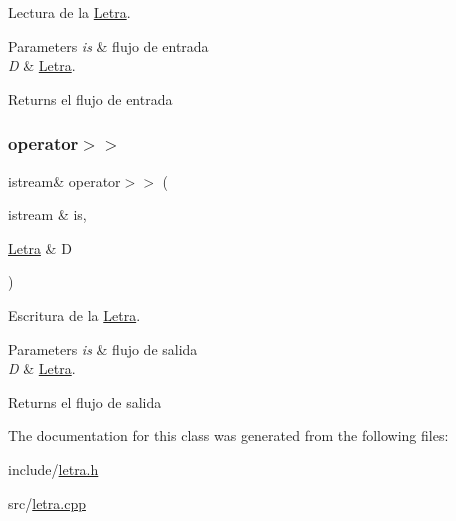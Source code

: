 Lectura de la \mbox{\hyperlink{classLetra}{Letra}}. 


\begin{DoxyParams}{Parameters}
{\em is} & flujo de entrada \\
\hline
{\em D} & \mbox{\hyperlink{classLetra}{Letra}}. \\
\hline
\end{DoxyParams}
\begin{DoxyReturn}{Returns}
el flujo de entrada 
\end{DoxyReturn}
\mbox{\label{classLetra_a2cfa9253e58d293cbbeeb108640809d8}} 
\subsubsection{\texorpdfstring{operator$>$$>$}{operator>>}}
{\footnotesize\ttfamily istream\& operator$>$$>$ (\begin{DoxyParamCaption}\item[{istream \&}]{is,  }\item[{\mbox{\hyperlink{classLetra}{Letra}} \&}]{D }\end{DoxyParamCaption})\hspace{0.3cm}{\ttfamily [friend]}}



Escritura de la \mbox{\hyperlink{classLetra}{Letra}}. 


\begin{DoxyParams}{Parameters}
{\em is} & flujo de salida \\
\hline
{\em D} & \mbox{\hyperlink{classLetra}{Letra}}. \\
\hline
\end{DoxyParams}
\begin{DoxyReturn}{Returns}
el flujo de salida 
\end{DoxyReturn}


The documentation for this class was generated from the following files\+:\begin{DoxyCompactItemize}
\item 
include/\mbox{\hyperlink{letra_8h}{letra.\+h}}\item 
src/\mbox{\hyperlink{letra_8cpp}{letra.\+cpp}}\end{DoxyCompactItemize}
